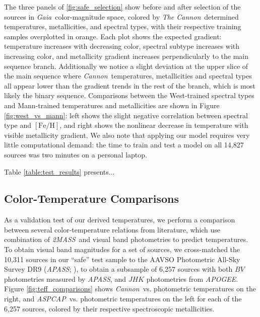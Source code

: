 \documentclass[modern]{aastex62}
\newcommand{\apogee}{\textsl{APOGEE}}
\newcommand{\thecannon}{\textsl{The Cannon}}
\newcommand{\cannon}{\textsl{Cannon}}
\newcommand{\aspcap}{\textsl{ASPCAP}}
\newcommand{\gaia}{\textsl{Gaia}}
\newcommand{\zmass}{\textsl{2MASS}}
\newcommand{\feh}{[{\mathrm{Fe}/\mathrm{H}}]}
\begin{document}
The three panels of \ref{fig:safe_selection} show before and after selection of the sources in \gaia\ color-magnitude space, colored by \thecannon\ determined temperatures, metallicities, and spectral types, with their respective training samples overplotted in orange. Each plot shows the expected gradient: temperature increases with decreasing color, spectral subtype increases with increasing color, and metallicity gradient increases perpendicularly to the main sequence branch. Additionally we notice a slight deviation at the upper slice of the main sequence where \cannon\ temperatures, metallicities and spectral types all appear lower than the gradient trends in the rest of the branch, which is most likely the binary sequence. Comparisons between the West-trained spectral types and Mann-trained temperatures and metallicities are shown in Figure \ref{fig:west_vs_mann}: left shows the slight negative correlation between spectral type and $\feh$, and right shows the nonlinear decrease in temperature with visible metallicity gradient. We also note that applying our model requires very little computational demand: the time to train and test a model on all 14,827 sources was two minutes on a personal laptop. 

Table \ref{table:test_results} presents...

\subsection{Color-Temperature Comparisons}

As a validation test of our derived temperatures, we perform a comparison between several color-temperature relations from literature, which use combination of \zmass\ and visual band photometries to predict temperatures. To obtain visual band magnitudes for a set of sources, we cross-matched the 10,311 sources in our ``safe'' test sample to the AAVSO Photometric All-Sky Survey DR9 (\textsl{APASS}; \citealt{Henden:2016}), to obtain a subsample of 6,257 sources with both $BV$ photometries measured by \textsl{APASS}, and $JHK$ photometries from \apogee. Figure \ref{fig:teff_comparisons} shows \cannon\ vs. photometric temperatures on the right, and \aspcap\ vs. photometric temperatures on the left for each of the 6,257 sources, colored by their respective spectroscopic metallicities.

\end{document}
